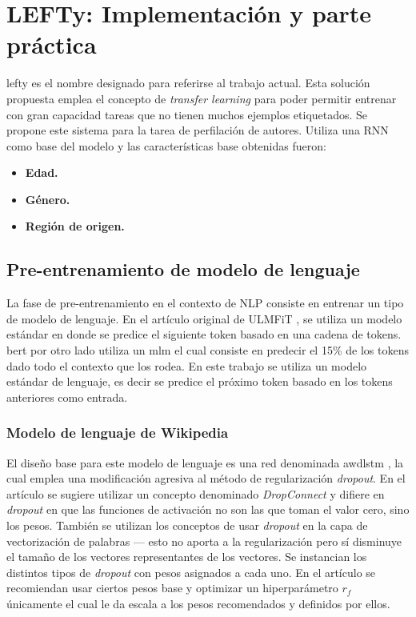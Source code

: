 
\chapter{LEFTy: Implementación y parte práctica}

\label{Chapter5} %

\gls{lefty} es el nombre designado para referirse al trabajo actual. Esta solución propuesta emplea el concepto de \textit{transfer learning} para poder permitir entrenar con gran capacidad tareas que no tienen muchos ejemplos etiquetados. Se propone este sistema para la tarea de perfilación de autores. Utiliza una RNN como base del modelo y las características base obtenidas fueron:

\begin{itemize}
\item \textbf{Edad.}
\item \textbf{Género.}
\item \textbf{Región de origen.}
\end{itemize}

\section{Pre-entrenamiento de modelo de lenguaje}

La fase de pre-entrenamiento en el contexto de NLP consiste en entrenar un tipo de modelo de lenguaje. En el artículo original de ULMFiT \parencite{howard2018}, se utiliza un modelo estándar en donde se predice el siguiente token basado en una cadena de tokens. \gls{bert} \parencite{devlin2018bert} por otro lado utiliza un \gls{mlm} el cual consiste en predecir el 15\% de los tokens dado todo el contexto que los rodea. En este trabajo se utiliza un modelo estándar de lenguaje, es decir se predice el próximo token basado en los tokens anteriores como entrada.

\subsection{Modelo de lenguaje de Wikipedia}

El diseño base para este modelo de lenguaje es una red denominada \gls{awdlstm} \parencite{merityRegOpt}, la cual emplea una modificación agresiva al método de regularización \textit{dropout}. En el artículo se sugiere utilizar un concepto denominado \textit{DropConnect} y difiere en \textit{dropout} en que las funciones de activación no son las que toman el valor cero, sino los pesos. También se utilizan los conceptos de usar \textit{dropout} en la capa de vectorización de palabras --- esto no aporta a la regularización pero sí disminuye el tamaño de los vectores representantes de los vectores. Se instancian los distintos tipos de \textit{dropout} con pesos asignados a cada uno. En el artículo se recomiendan usar ciertos pesos base y optimizar un hiperparámetro $r_f$ únicamente el cual le da escala a los pesos recomendados y definidos por ellos.

